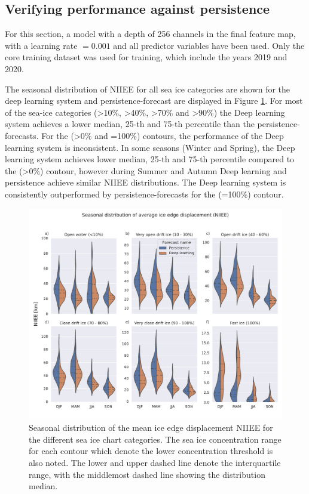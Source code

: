 \documentclass[../main/thesis.tex]{subfiles}
\begin{document}
\subsection{Verifying performance against persistence}
\label{sec:performance-persistence}
For this section, a model with a depth of 256 channels in the final feature map, with a learning rate $=0.001$ and all predictor variables have been used. Only the core training dataset was used for training, which include the years 2019 and 2020.

The seasonal distribution of NIIEE for all sea ice categories are shown for the deep learning system and persistence-forecast are displayed in Figure \ref{fig:violins}. For most of the sea-ice categories (>10\%, >40\%, >70\% and >90\%) the Deep learning system achieves a lower median, 25-th and 75-th percentile than the persistence-forecasts. For the (>0\% and =100\%) contours, the performance of the Deep learning system is inconsistent. In some seasons (Winter and Spring), the Deep learning system achieves lower median, 25-th and 75-th percentile compared to the (>0\%) contour, however during Summer and Autumn Deep learning and persistence achieve similar NIIEE distributions. The Deep learning system is consistently outperformed by persistence-forecasts for the (=100\%) contour.

\begin{figure}
    \centering
    \includegraphics[width=\textwidth]{niiee}
    \caption{\label{fig:violins}Seasonal distribution of the mean ice edge displacement NIIEE for the different sea ice chart categories. The sea ice concentration range for each contour which denote the lower concentration threshold is also noted. The lower and upper dashed line denote the interquartile range, with the middlemost dashed line showing the distribution median.}
\end{figure}
\end{document}
